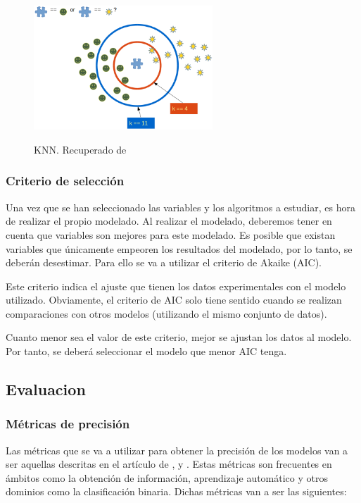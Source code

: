 \begin{enumerate}
	\begin{figure}[htb]
		\centering
		\caption{KNN. Recuperado de \protect{}}
		\includegraphics[width=0.6\textwidth]{recursos/k_NN}
		\label {fig:KNN}
	\end{figure}
	\FloatBarrier
	
	
\end{enumerate}

\subsubsection{Criterio de selección}
Una vez que se han seleccionado las variables y los algoritmos a estudiar, es hora de realizar el propio modelado. Al realizar el modelado, deberemos tener en cuenta que variables son mejores para este modelado. Es posible que existan variables que únicamente empeoren los resultados del modelado, por lo tanto, se deberán desestimar. Para ello se va a utilizar el criterio de Akaike (AIC). 

Este criterio indica el ajuste que tienen los datos experimentales con el modelo utilizado. Obviamente, el criterio de AIC solo tiene sentido cuando se realizan comparaciones con otros modelos (utilizando el mismo conjunto de datos). \cite{martinez2009criterio}

Cuanto menor sea el valor de este criterio, mejor se ajustan los datos al modelo. Por tanto, se deberá seleccionar el modelo que menor AIC tenga. \cite{martinez2009criterio}

\subsection{Evaluacion}
\subsubsection{Métricas de precisión}
Las métricas que se va a utilizar para obtener la precisión de los modelos van a ser aquellas descritas en el artículo de  ,  y . Estas métricas son frecuentes en ámbitos como la obtención de información, aprendizaje automático y otros dominios como la clasificación binaria. Dichas métricas van a ser las siguientes:

